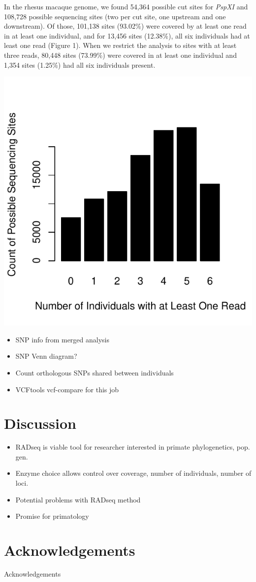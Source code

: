 \documentclass[12pt]{article}
\begin{document}
In the rhesus macaque genome, we found 54,364 possible cut sites for \emph{PspXI} and 108,728 possible sequencing sites (two per cut site, one upstream and one downstream). Of those, 101,138 sites (93.02\%) were covered by at least one read in at least one individual, and for 13,456 sites (12.38\%), all six individuals had at least one read (Figure 1). When we restrict the analysis to sites with at least three reads, 80,448 sites (73.99\%) were covered in at least one individual and 1,354 sites (1.25\%) had all six individuals present.

\includegraphics{figs/seq_site_coverage_by_ind}

\begin{itemize}
	\item SNP info from merged analysis
	\item SNP Venn diagram?
	\item Count orthologous SNPs shared between individuals
	\item VCFtools vcf-compare for this job
\end{itemize}

\section{Discussion}
\begin{itemize}
	\item RADseq is viable tool for researcher interested in primate phylogenetics, pop. gen.
	\item Enzyme choice allows control over coverage, number of individuals, number of loci.
	\item Potential problems with RADseq method
	\item Promise for primatology
\end{itemize}

\section{Acknowledgements}
Acknowledgements
\end{document}
